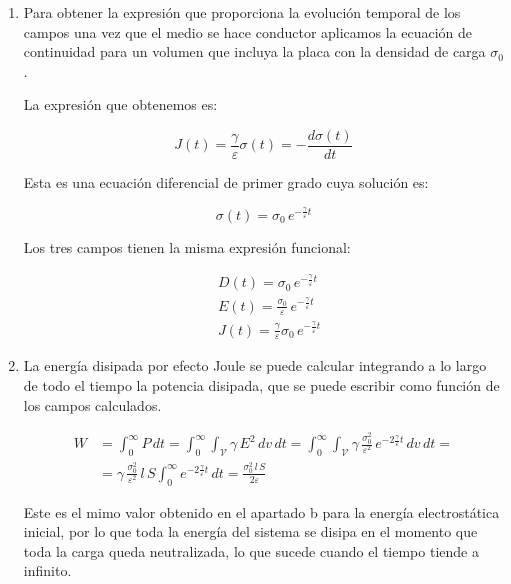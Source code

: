 \begin{enumerate}
    \vspace{20px}

    \item Para obtener la expresión que proporciona la evolución temporal de los campos una vez que el medio se hace conductor aplicamos la
    ecuación de continuidad para un volumen que incluya la placa con la densidad de carga $\sigma_0$.

    La expresión que obtenemos es:

    \begin{equation*}
        J (t) =  \frac{\gamma}{\varepsilon} \sigma(t) = - \frac{d \sigma (t)}{dt}
    \end{equation*}

    Esta es una ecuación diferencial de primer grado cuya solución es:

    \begin{equation*}
        \sigma(t) = \sigma_0 \, e^{-\frac{\gamma}{\varepsilon}t}
    \end{equation*}

    Los tres campos tienen la misma expresión funcional:

    \begin{align*}
        & D(t)  = \sigma_0 \, e^{-\frac{\gamma}{\varepsilon}t} \\[6px]
        & E(t) = \frac{\sigma_0}{\varepsilon} \, e^{-\frac{\gamma}{\varepsilon}t} \\[6px]
        & J(t)  = \frac{\gamma}{\varepsilon} \sigma_0 \, e^{-\frac{\gamma}{\varepsilon}t}
    \end{align*}

    \vspace{20px}

    \item La energía disipada por efecto Joule se puede calcular integrando a lo largo de todo el tiempo la potencia disipada, que
    se puede escribir como función de los campos calculados.

    \begin{align*}
        W & =  \int_0^{\infty} P \, dt =  \int_0^{\infty} \int_{\mathcal{V}} \gamma \, E^2 \, dv \, dt =
        \int_0^{\infty} \int_{\mathcal{V}} \gamma \, \frac{\sigma_0^2}{\varepsilon^2}  \, e^{-2\frac{\gamma}{\varepsilon}t}  \, dv \, dt = \\[6px]
        & =  \gamma \, \frac{\sigma_0^2}{\varepsilon^2}  \, l \, S  \int_0^{\infty} e^{-2\frac{\gamma}{\varepsilon}t} \, dt =
        \frac{\sigma_0^2 \, l \, S}{2 \varepsilon}
    \end{align*}

    Este es el mimo valor obtenido en el apartado b para la energía electrostática inicial, por lo que toda la energía del sistema se disipa
    en el momento que toda la carga queda neutralizada, lo que sucede cuando el tiempo tiende a infinito.

\end{enumerate}